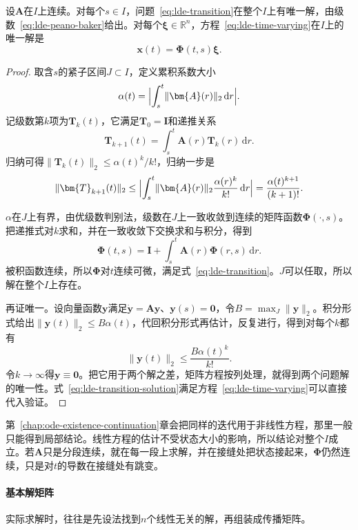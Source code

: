 \begin{theorem}[线性系统的整体存在唯一]
\label{thm:lde-transition-existence}
设$\bm{A}$在$I$上连续。对每个$s\in I$，问题~\eqref{eq:lde-transition}在整个$I$上有唯一解，由级数~\eqref{eq:lde-peano-baker}给出。对每个$\bm{\xi}\in\mathbb{R}^n$，方程~\eqref{eq:lde-time-varying}在$I$上的唯一解是
\begin{equation}
 \bm{x}(t)=\bm{\Phi}(t,s)\bm{\xi}.
 \label{eq:lde-transition-solution}
\end{equation}
\end{theorem}

\begin{proof}
取含$s$的紧子区间$J\subset I$，定义累积系数大小
\[
 \alpha(t)=\Bigl\lvert\int_s^t\lVert\bm{A}(r)\rVert_2\,\mathrm{d}r\Bigr\rvert.
\]
记级数第$k$项为$\bm{T}_k(t)$，它满足$\bm{T}_0=\bm{I}$和递推关系
\[
 \bm{T}_{k+1}(t)=\int_s^t\bm{A}(r)\bm{T}_k(r)\,\mathrm{d}r.
\]
归纳可得$\lVert\bm{T}_k(t)\rVert_2\leq\alpha(t)^k/k!$，归纳一步是
\[
 \lVert\bm{T}_{k+1}(t)\rVert_2\leq\Bigl\lvert\int_s^t\lVert\bm{A}(r)\rVert_2\frac{\alpha(r)^k}{k!}\,\mathrm{d}r\Bigr\rvert=\frac{\alpha(t)^{k+1}}{(k+1)!}.
\]

$\alpha$在$J$上有界，由优级数判别法，级数在$J$上一致收敛到连续的矩阵函数$\bm{\Phi}(\cdot,s)$。把递推式对$k$求和，并在一致收敛下交换求和与积分，得到
\[
 \bm{\Phi}(t,s)=\bm{I}+\int_s^t\bm{A}(r)\bm{\Phi}(r,s)\,\mathrm{d}r.
\]
被积函数连续，所以$\bm{\Phi}$对$t$连续可微，满足式~\eqref{eq:lde-transition}。$J$可以任取，所以解在整个$I$上存在。

再证唯一。设向量函数$\bm{y}$满足$\dot{\bm{y}}=\bm{A}\bm{y}$、$\bm{y}(s)=\bm{0}$，令$B=\max_J\lVert\bm{y}\rVert_2$。积分形式给出$\lVert\bm{y}(t)\rVert_2\leq B\alpha(t)$，代回积分形式再估计，反复进行，得到对每个$k$都有
\[
 \lVert\bm{y}(t)\rVert_2\leq\frac{B\alpha(t)^k}{k!}.
\]
令$k\to\infty$得$\bm{y}\equiv\bm{0}$。把它用于两个解之差，矩阵方程按列处理，就得到两个问题解的唯一性。式~\eqref{eq:lde-transition-solution}满足方程~\eqref{eq:lde-time-varying}可以直接代入验证。
\end{proof}

第~\ref{chap:ode-existence-continuation}章会把同样的迭代用于非线性方程，那里一般只能得到局部结论。线性方程的估计不受状态大小的影响，所以结论对整个$I$成立。若$\bm{A}$只是分段连续，就在每一段上求解，并在接缝处把状态接起来，$\bm{\Phi}$仍然连续，只是对$t$的导数在接缝处有跳变。

\paragraph{基本解矩阵}
实际求解时，往往是先设法找到$n$个线性无关的解，再组装成传播矩阵。

